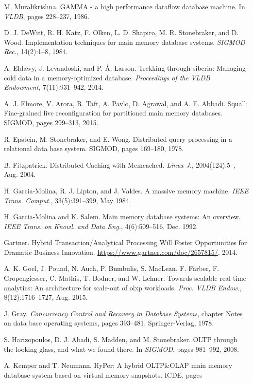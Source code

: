 \documentclass[a4paper,11pt,twoside,openright]{article}
\begin{document}
\begin{enumerate}[label={[}\arabic*{]}]
  M. Muralikrishna. GAMMA - a high performance dataflow database
  machine. In \emph{VLDB}, pages 228--237, 1986.
\item
  D. J. DeWitt, R. H. Katz, F. Olken, L. D. Shapiro, M. R. Stonebraker,
  and D. Wood. Implementation techniques for main memory database
  systems. \emph{SIGMOD Rec.}, 14(2):1--8, 1984.
\item
  A. Eldawy, J. Levandoski, and P.-\r{A}. Larson. Trekking through siberia:
  Managing cold data in a memory-optimized database. \emph{Proceedings
  of the VLDB Endowment}, 7(11):931--942, 2014.
\item
  A. J. Elmore, V. Arora, R. Taft, A. Pavlo, D. Agrawal, and A. E.
  Abbadi. Squall: Fine-grained live reconfiguration for partitioned main
  memory databases. SIGMOD, pages 299--313, 2015.
\item
  R. Epstein, M. Stonebraker, and E. Wong. Distributed query processing
  in a relational data base system. SIGMOD, pages 169--180, 1978.
\item
  B. Fitzpatrick. Distributed Caching with Memcached.
  \emph{Linux J.}, 2004(124):5--, Aug. 2004.
\item
  H. Garcia-Molina, R. J. Lipton, and J. Valdes. A massive memory
  machine. \emph{IEEE Trans. Comput.}, 33(5):391--399, May 1984.
\item
  H. Garcia-Molina and K. Salem. Main memory database systems: An
  overview. \emph{IEEE Trans. on Knowl. and Data Eng.}, 4(6):509--516,
  Dec. 1992.
\item
  Gartner. Hybrid Transaction/Analytical Processing Will Foster
  Opportunities for Dramatic Business Innovation.
  \url{https://www.gartner.com/doc/2657815/}, 2014.
\item A. K. Goel, J.
Pound, N. Auch, P. Bumbulis,
S. MacLean, F. F\"{a}rber, F. Gropengiesser, C. Mathis, T. Bodner, and W.
Lehner. Towards scalable real-time analytics: An architecture for
scale-out of olxp workloads. \emph{Proc. VLDB Endow.}, 8(12):1716--1727,
Aug. 2015.
\item
  J. Gray. \emph{Concurrency Control and Recovery in Database Systems},
  chapter Notes on data base operating systems, pages 393--481.
  Springer-Verlag, 1978.
\item
  S. Harizopoulos, D. J. Abadi, S. Madden, and M. Stonebraker. OLTP
  through the looking glass, and what we found there. In \emph{SIGMOD},
  pages 981--992, 2008.
\item
  A. Kemper and T. Neumann. HyPer: A hybrid OLTP\&OLAP main memory
  database system based on virtual memory snapshots. ICDE, pages

\end{enumerate}
\end{document}
